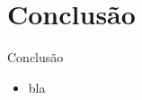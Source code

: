 \documentclass[10pt]{beamer}
\newcommand{\themename}{\textbf{\textsc{metropolis}}\xspace}
\begin{document}






\section{Conclusão}

\begin{frame}[fragile]{Conclusão}

  \begin{center}

      \begin{itemize}

        \item bla


      \end{itemize}
 
  \end{center}

\end{frame}


\appendix
\end{document}
